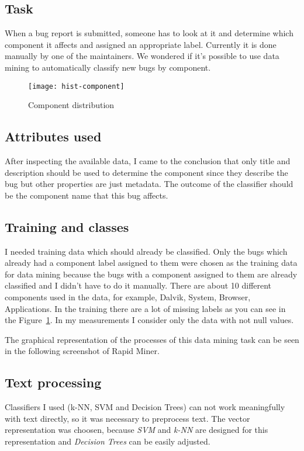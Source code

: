 
\subsection*{Task} %
\label{sub:Task}
When a bug report is submitted, someone has to look at it and determine which component it affects and assigned an appropriate label. Currently it is done manually by one of the maintainers. We wondered if it's possible to use data mining to automatically classify new bugs by component.

\begin{figure}[!htp]
\begin{center} 
\texttt{[image: hist-component]}
\caption{\label{fig:component}Component distribution}
\end{center}
\end{figure}

\subsection*{Attributes used} %
\label{sub:Attributes used}
After inspecting the available data, I came to the conclusion that only title and description should be used to determine the component since they describe the bug but other properties are just metadata. The outcome of the classifier should be the component name that this bug affects.

\subsection*{Training and classes} %
\label{sub:Training and classes}
I needed training data which should already be classified. Only the bugs which already had a component label assigned to them were chosen as the training data for data mining because the bugs with a component assigned to them are already classified and I didn't have to do it manually. There are about 10 different components used in the data, for example, Dalvik, System, Browser, Applications.
In the training there are a lot of missing labels as you can see in the  Figure~\ref{fig:component}. In my measurements I consider only the data with not null values.

The graphical representation of the processes of this data mining task can be seen in the following screenshot of Rapid Miner.


\subsection*{Text processing} %
\label{sub:Text processing}
Classifiers I used (k-NN, SVM and Decision Trees) can not work meaningfully with text directly, so it was necessary to preprocess text. The vector representation was choosen, because {\it SVM} and {\it k-NN} are designed for this representation and {\it Decision Trees} can be easily adjusted.

